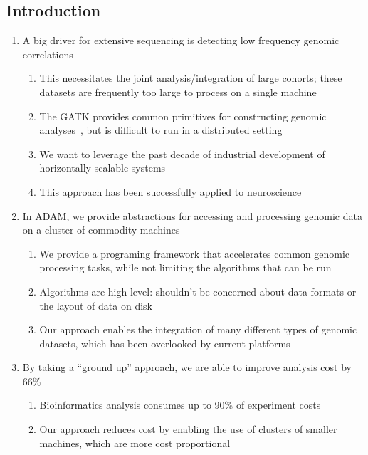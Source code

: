 \documentclass{nature}
\begin{document}
\begin{refsegment}
\section{Introduction}
\label{sec:introduction}

\begin{enumerate}
\item A big driver for extensive sequencing is detecting low frequency genomic correlations
\begin{enumerate}
\item This necessitates the joint analysis/integration of large cohorts; these datasets are
frequently too large to process on a single machine
\item The GATK provides common primitives for constructing genomic analyses~\cite{mckenna10}, but
is difficult to run in a distributed setting
\item We want to leverage the past decade of industrial development of horizontally scalable
systems~\cite{zaharia10, dean08}
\item This approach has been successfully applied to neuroscience~\cite{freeman14}
\end{enumerate}
\item In ADAM, we provide abstractions for accessing and processing genomic data on a cluster
of commodity machines
\begin{enumerate}
\item We provide a programing framework that accelerates common genomic processing tasks, while
not limiting the algorithms that can be run
\item Algorithms are high level: shouldn't be concerned about data formats or the layout
of data on disk
\item Our approach enables the integration of many different types of genomic datasets, which
has been overlooked by current platforms~\cite{palsson10}
\end{enumerate}
\item By taking a ``ground up'' approach, we are able to improve analysis cost by 66\%
\begin{enumerate}
\item Bioinformatics analysis consumes up to 90\% of experiment costs~\cite{andrews14}
\item Our approach reduces cost by enabling the use of clusters of smaller machines, which are
more cost proportional~\cite{janapa10}
\end{enumerate}
\end{enumerate}


\end{refsegment}
\end{document}
